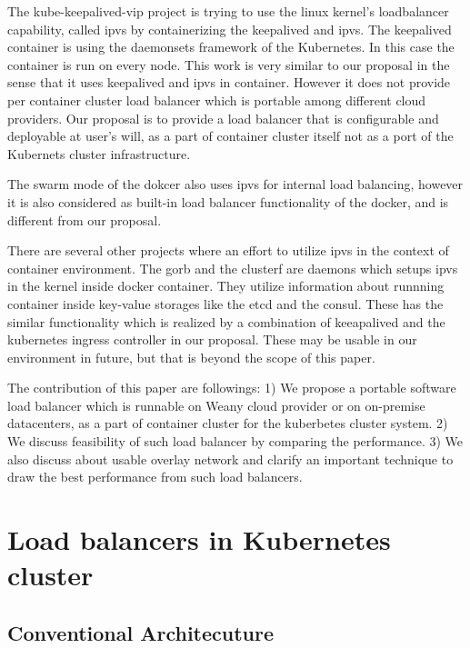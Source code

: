 The kube-keepalived-vip\cite{Prashanth2016} project is trying to use the linux kernel's loadbalancer capability, 
called ipvs\cite{Zhang2000} by containerizing the keepalived\cite{ACassen2016} and ipvs. 
The keepalived container is using the daemonsets\cite{K8sDaemonsets2017} framework of the Kubernetes. 
In this case the container is run on every node.
This work is very similar to our proposal in the sense that it uses keepalived and ipvs in container. 
However it does not provide per container cluster load balancer which is portable among different cloud providers.   
Our proposal is to provide a load balancer that is configurable and deployable at user's will,
 as a part of container cluster itself not as a port of the Kubernets cluster infrastructure.  

The swarm mode of the dokcer\cite{DockerCoreEngineering2016,DockerInc2017} also uses ipvs for internal load balancing,
however it is also considered as built-in load balancer functionality of the docker, 
and is different from our proposal.

There are several other projects where an effort to utilize ipvs in the context of container environment.
The gorb\cite{Sibiryov2015} and the clusterf\cite{Aaltodoc:http://urn.fi/URN:NBN:fi:aalto-201611025433} are daemons 
which setups ipvs in the kernel inside docker container. They utilize information about runnning container inside key-value storages
like the etcd\cite{CoreOSEtcd} and the consul\cite{HashiCorpConsul}. 
These has the similar functionality which is realized by a combination of keeapalived and the kubernetes ingress controller in our proposal.
These may be usable in our environment in future, but that is beyond the scope of this paper.

The contribution of this paper are followings: 
1) We propose a portable software load balancer 
which is runnable on Weany cloud provider or on on-premise datacenters, 
as a part of container cluster for the kuberbetes cluster system.
2) We discuss feasibility of such load balancer by comparing the performance.
3) We also discuss about usable overlay network and clarify an important technique 
to draw the best performance from such load balancers.  


\section{Load balancers in Kubernetes cluster}\label{Load balancers in Kubernetes cluster}

\subsection{Conventional Architecuture}

